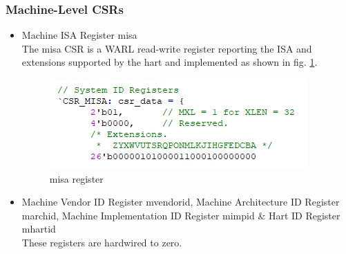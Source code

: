 \documentclass[../main.tex]{subfiles}
\begin{document}
\subsubsection{Machine-Level CSRs}
\begin{itemize}
    \item Machine ISA Register misa\\
        The misa CSR is a WARL read-write register reporting the ISA and extensions supported by the hart and implemented as shown in fig. \ref{fig:misa}.
        \begin{figure}[h]
            \centering
                \includegraphics[width=10 cm]{diagrams/misa.png}
                \caption{misa register}
                \label{fig:misa}
        \end{figure}
    
    \item Machine Vendor ID Register mvendorid, Machine Architecture ID Register marchid, Machine     Implementation ID Register mimpid \& Hart ID Register mhartid\\
        These registers are hardwired to zero.\\


\end{itemize}
\end{document}
